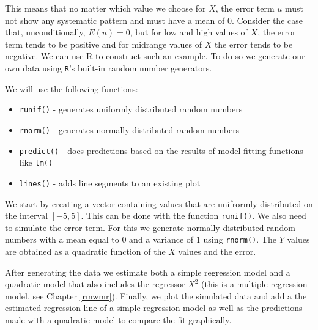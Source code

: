 \documentclass[]{book}
\providecommand{\tightlist}{%
  \setlength{\itemsep}{0pt}\setlength{\parskip}{0pt}}
\theoremstyle{definition}
\theoremstyle{definition}
\theoremstyle{definition}
\theoremstyle{remark}
\begin{document}
This means that no matter which value we choose for \(X\), the error
term \(u\) must not show any systematic pattern and must have a mean of
\(0\). Consider the case that, unconditionally, \(E(u) = 0\), but for
low and high values of \(X\), the error term tends to be positive and
for midrange values of \(X\) the error tends to be negative. We can use
R to construct such an example. To do so we generate our own data using
\texttt{R}'s built-in random number generators.

We will use the following functions:

\begin{itemize}
\tightlist
\item
  \texttt{runif()} - generates uniformly distributed random numbers
\item
  \texttt{rnorm()} - generates normally distributed random numbers
\item
  \texttt{predict()} - does predictions based on the results of model
  fitting functions like \texttt{lm()}
\item
  \texttt{lines()} - adds line segments to an existing plot
\end{itemize}

We start by creating a vector containing values that are unifrormly
distributed on the interval \([-5,5]\). This can be done with the
function \texttt{runif()}. We also need to simulate the error term. For
this we generate normally distributed random numbers with a mean equal
to \(0\) and a variance of \(1\) using \texttt{rnorm()}. The \(Y\)
values are obtained as a quadratic function of the \(X\) values and the
error.

After generating the data we estimate both a simple regression model and
a quadratic model that also includes the regressor \(X^2\) (this is a
multiple regression model, see Chapter \ref{rmwmr}). Finally, we plot
the simulated data and add a the estimated regression line of a simple
regression model as well as the predictions made with a quadratic model
to compare the fit graphically.
\end{document}
